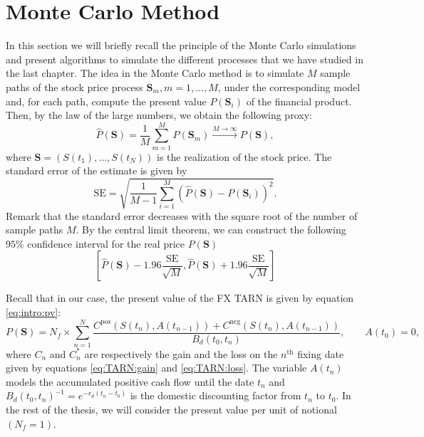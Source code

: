 \section{Monte Carlo Method }
\label{sec:methods:MC}
In this section we will briefly recall the principle of the Monte Carlo simulations and present algorithms to simulate the different processes that we have studied in the last chapter. The idea in the Monte Carlo method is to simulate $M$ sample paths of the stock price process $\mathbf{S}_m, m=1,\ldots,M$, under the corresponding model and, for each path, compute the present value $P(\mathbf{S}_i)$ of the financial product. Then, by the law of the large numbers, we obtain the following proxy:
$$\hat{P}(\mathbf{S})=\frac{1}{M}\sum_{m=1}^M P(\mathbf{S}_m)\xrightarrow{M\to\infty} P(\mathbf{S}),$$
where $\mathbf{S}=(S(t_1),\ldots,S(t_N))$ is the realization of the stock price. The standard error of the estimate is given by
$$\text{SE} = \sqrt{\frac{1}{M-1}\sum_{i=1}^M \left(\hat{P}(\mathbf{S})-P(\mathbf{S}_i)\right)^2}.$$
Remark that the standard error decreases with the square root of the number of sample paths $M$. By the central limit theorem, we can construct the following $95\%$ confidence interval for the real price $P(\mathbf{S})$
$$\left[\hat{P}(\mathbf{S})-1.96\frac{\text{SE}}{\sqrt{M}},\hat{P}(\mathbf{S})+1.96\frac{\text{SE}}{\sqrt{M}} \right]$$

Recall that in our case, the present value of the FX TARN is given by equation \eqref{eq:intro:pv}:
$$P(\mathbf{S}) =N_f \times \sum_{n=1}^N\frac{C^\text{pos}(S(t_n),A(t_{n-1}))+C^\text{neg}(S(t_n),A(t_{n-1}))}{B_d(t_0,t_n)}, \qquad A(t_0)=0,$$
where $C_n$ and $C_n^\ast$ are respectively the gain and the loss on the $n^\text{th}$ fixing date given by equations \eqref{eq:TARN:gain} and \eqref{eq:TARN:loss}. The variable $A(t_n)$ models the accumulated positive cash flow until the date $t_n$ and $B_d(t_0,t_n)^{-1}=e^{-r_d(t_n-t_0)}$ is the domestic discounting factor from $t_n$ to $t_0$. In the rest of the thesis, we will consider the present value per unit of notional $(N_f=1)$.

